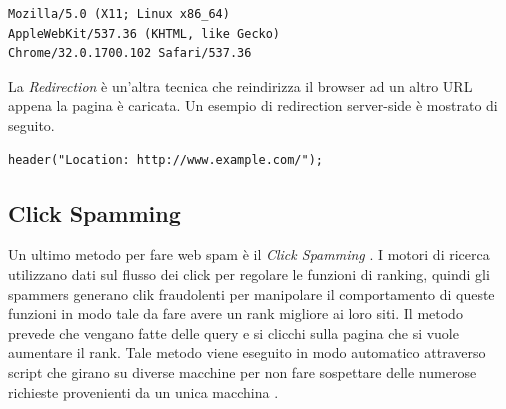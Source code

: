 \begin{lstlisting}[frame=trbl,postbreak=\space, breakindent=5pt, breaklines]
Mozilla/5.0 (X11; Linux x86_64) 
AppleWebKit/537.36 (KHTML, like Gecko) 
Chrome/32.0.1700.102 Safari/537.36
\end{lstlisting}
La \textit{Redirection} è un'altra tecnica che reindirizza il browser ad un altro URL appena la pagina è caricata. Un esempio di redirection server-side è mostrato di seguito.
\begin{lstlisting}[frame=trbl,postbreak=\space, breakindent=5pt, breaklines]
header("Location: http://www.example.com/");
\end{lstlisting}
\subsection{Click Spamming}
Un ultimo metodo per fare web spam è il \textit{Click Spamming} \cite{Spirin:2012:SWS:2207243.2207252}. I motori di ricerca utilizzano dati sul flusso dei click per regolare le funzioni di ranking, quindi  gli spammers generano clik fraudolenti per manipolare il comportamento di queste funzioni in modo tale da fare avere un rank migliore ai loro siti. Il metodo prevede che vengano fatte delle query e si clicchi sulla pagina che si vuole aumentare il rank. Tale metodo viene eseguito in modo automatico attraverso script che girano su diverse macchine per non fare sospettare delle numerose richieste provenienti da un unica macchina \cite{Spirin:2012:SWS:2207243.2207252}.


